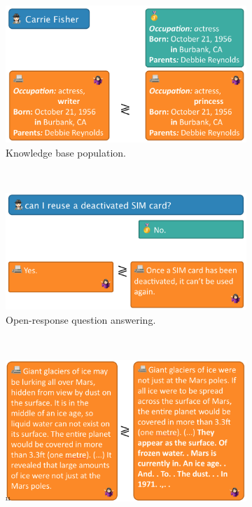 \begin{figure}
  \centering
  \begin{subfigure}{0.65\textwidth}
    \includegraphics[width=\textwidth]{figures/example-kbp}
    \caption{\label{fig:intro:example-kbp} Knowledge base population.}
  \end{subfigure} \\
  \begin{subfigure}{0.65\textwidth}%
    \includegraphics[width=\textwidth]{figures/example-qa}
    \caption{\label{fig:intro:example-qa} Open-response question answering.}
  \end{subfigure} \\
  \begin{subfigure}{0.65\textwidth}
    \includegraphics[width=\textwidth]{figures/example-summarization}

\end{subfigure}
\end{figure}

